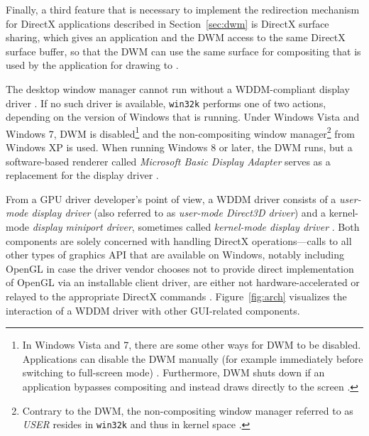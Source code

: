 			Finally, a third feature that is necessary to implement the redirection
			mechanism for DirectX applications described in Section~\ref{sec:dwm}
			is DirectX surface sharing, which gives an application and the DWM
			access to the same DirectX surface buffer, so that the DWM can use the
			same surface for compositing that is used by the application for
			drawing to \cite{dwmredirect}.

			The desktop window manager cannot run without a WDDM-compliant
			display driver \cite{dwmwddm}. If no such driver is available,
			\texttt{win32k} \cite{probertwin32k} performs one of two actions,
			depending on the version of Windows that is running. Under Windows
			Vista and Windows 7, DWM is disabled\footnote{In Windows Vista and
			7, there are some other ways for DWM to be disabled. Applications
			can disable the DWM manually (for example immediately before
			switching to full-screen mode) \cite{disabledwm}. Furthermore, DWM
			shuts down if an application bypasses compositing and instead draws
			directly to the screen \cite{dwmredirect}.} and the non-compositing
			window manager\footnote{Contrary to the DWM, the non-compositing
			window manager referred to as \textit{USER} resides in
			\texttt{win32k} and thus in kernel space \cite{probertwin32k}.}
			from Windows XP is used. When running Windows 8 or later, the DWM
			runs, but a software-based renderer called \textit{Microsoft Basic
			Display Adapter} serves as a replacement for the display driver
			\cite{dwmalwayson}.

			From a GPU driver developer's point of view, a WDDM driver consists
			of a \textit{user-mode display driver} (also referred to as
			\textit{user-mode Direct3D driver}) and a kernel-mode
			\textit{display miniport driver}, sometimes called \textit{kernel-mode
			display driver} \cite{wddmarch}. Both components are solely concerned with handling
			DirectX operations---calls to all other types of graphics API that
			are available on Windows, notably including OpenGL in case the driver
			vendor chooses not to provide direct implementation of OpenGL via
			an installable client driver, are either not
			hardware-accelerated or relayed to the appropriate DirectX commands
			\cite{d2dvsgdi}.
			Figure~\ref{fig:arch} visualizes the interaction of a WDDM driver with
			other GUI-related components.

